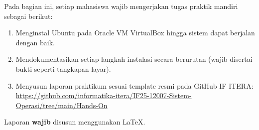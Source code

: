 Pada bagian ini, setiap mahasiswa wajib mengerjakan tugas praktik mandiri sebagai berikut:
\begin{enumerate}
    \item Menginstal Ubuntu pada Oracle VM VirtualBox hingga sistem dapat berjalan dengan baik.
    \item Mendokumentasikan setiap langkah instalasi secara berurutan (wajib disertai bukti seperti tangkapan layar).
    \item Menyusun laporan praktikum sesuai template resmi pada GitHub IF ITERA:
    \url{https://github.com/informatika-itera/IF25-12007-Sistem-Operasi/tree/main/Hands-On}
\end{enumerate}

Laporan \textbf{wajib} disusun menggunakan \LaTeX.
